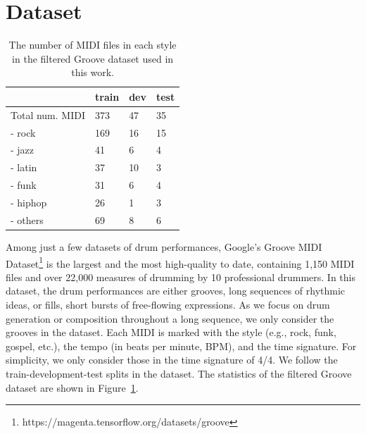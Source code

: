 \documentclass[letterpaper]{article} %
\begin{document}
\section{Dataset}
\begin{table}[t!]
\centering
\begin{tabular}{llll}
\toprule
& train & dev & test \\ \midrule
Total num. MIDI   & 373   & 47  & 35   \\
- rock &   169    &  16   &  15    \\
- jazz &   41    &  6   &   4   \\
- latin &   37    &  10   &  3    \\
- funk &    31   &  6   &   4   \\
- hiphop &   26    &  1   &    3  \\
- others &   69    &  8   &   6   \\
\bottomrule
\end{tabular}
\caption{The number of MIDI files in each style in the filtered Groove dataset used in this work.}
\label{fig:dataset_stats}
\end{table}

Among just a few datasets of drum performances, Google's Groove MIDI Dataset\footnote{https://magenta.tensorflow.org/datasets/groove} is the largest and the most high-quality to date, containing 1,150 MIDI files and over 22,000 measures of drumming by 10 professional drummers. In this dataset, the drum performances are either grooves, long sequences of rhythmic ideas, or fills, short bursts of free-flowing expressions. As we focus on drum generation or composition throughout a long sequence, we only consider the grooves in the dataset. Each MIDI is marked with the style (e.g., rock, funk, gospel, etc.), the tempo (in beats per minute, BPM), and the time signature. For simplicity, we only consider those in the time signature of 4/4. We follow the train-development-test splits in the dataset. The statistics of the filtered Groove dataset are shown in Figure~\ref{fig:dataset_stats}.
\end{document}
